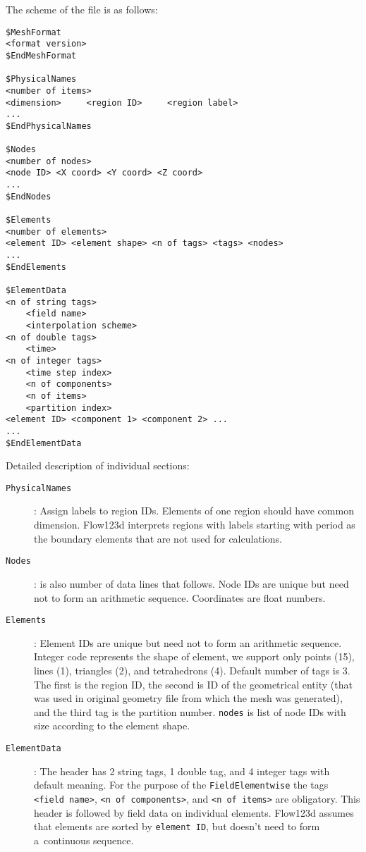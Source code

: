 The scheme of the file is as follows:
\begin{verbatim}
$MeshFormat
<format version>
$EndMeshFormat

$PhysicalNames
<number of items>
<dimension>     <region ID>     <region label>
...
$EndPhysicalNames

$Nodes
<number of nodes>
<node ID> <X coord> <Y coord> <Z coord>
...
$EndNodes

$Elements
<number of elements>
<element ID> <element shape> <n of tags> <tags> <nodes>
...
$EndElements

$ElementData
<n of string tags>
    <field name>
    <interpolation scheme>
<n of double tags>
    <time>
<n of integer tags>
    <time step index>
    <n of components>
    <n of items>
    <partition index>
<element ID> <component 1> <component 2> ...
...
$EndElementData
\end{verbatim}
Detailed description of individual sections:
\begin{description}
 \item[{\tt PhysicalNames}] : Assign labels to region IDs. Elements of one region should have common dimension. 
    Flow123d interprets regions with labels starting with period as the boundary elements that are not used for calculations.
 \item[{\tt Nodes}] : {\tt <number of nodes>} is also number of data lines that follows. 
    Node IDs are unique but need not to form an arithmetic sequence. Coordinates are float numbers.
 \item[{\tt Elements}] : Element IDs are unique but need not to form an arithmetic sequence. 
    Integer code {\tt <element shape>} represents the shape of element, we support only points (15), lines (1), triangles (2), and tetrahedrons (4).
    Default number of tags is 3. The first is the region ID, the second is ID of the geometrical entity (that was used in original geometry file from which the mesh was generated),
    and the third tag is the partition number. {\tt nodes} is list of node IDs with size according to the element shape.
 \item[{\tt ElementData}] : The header has 2 string tags, 1 double tag, and 4 integer tags with default meaning. For the purpose of the \verb'FieldElementwise' the tags
    \verb'<field name>', \verb'<n of components>', and \verb'<n of items>' are obligatory. This header is followed by field data on individual elements. 
    Flow123d assumes that elements are sorted by {\tt element ID}, but doesn't need to form a~continuous sequence.
\end{description}


